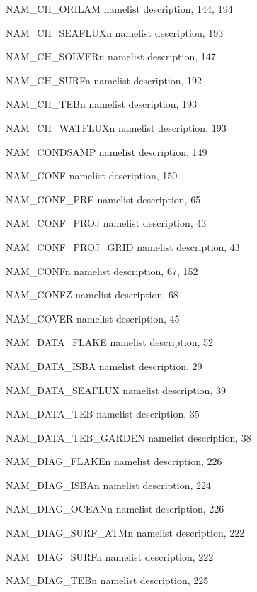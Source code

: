 \begin{theindex}
  \item NAM\_CH\_ORILAM
    \subitem namelist description,  144, 194
  \item NAM\_CH\_SEAFLUXn
    \subitem namelist description,  193
  \item NAM\_CH\_SOLVERn
    \subitem namelist description,  147
  \item NAM\_CH\_SURFn
    \subitem namelist description,  192
  \item NAM\_CH\_TEBn
    \subitem namelist description,  193
  \item NAM\_CH\_WATFLUXn
    \subitem namelist description,  193
  \item NAM\_CONDSAMP
    \subitem namelist description,  149
  \item NAM\_CONF
    \subitem namelist description,  150
  \item NAM\_CONF\_PRE
    \subitem namelist description,  65
  \item NAM\_CONF\_PROJ
    \subitem namelist description,  43
  \item NAM\_CONF\_PROJ\_GRID
    \subitem namelist description,  43
  \item NAM\_CONFn
    \subitem namelist description,  67, 152
  \item NAM\_CONFZ
    \subitem namelist description,  68
  \item NAM\_COVER
    \subitem namelist description,  45
  \item NAM\_DATA\_FLAKE
    \subitem namelist description,  52
  \item NAM\_DATA\_ISBA
    \subitem namelist description,  29
  \item NAM\_DATA\_SEAFLUX
    \subitem namelist description,  39
  \item NAM\_DATA\_TEB
    \subitem namelist description,  35
  \item NAM\_DATA\_TEB\_GARDEN
    \subitem namelist description,  38
  \item NAM\_DIAG\_FLAKEn
    \subitem namelist description,  226
  \item NAM\_DIAG\_ISBAn
    \subitem namelist description,  224
  \item NAM\_DIAG\_OCEANn
    \subitem namelist description,  226
  \item NAM\_DIAG\_SURF\_ATMn
    \subitem namelist description,  222
  \item NAM\_DIAG\_SURFn
    \subitem namelist description,  222
  \item NAM\_DIAG\_TEBn
    \subitem namelist description,  225

\end{theindex}
